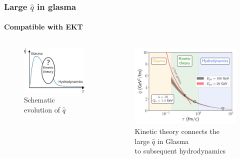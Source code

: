 \documentclass[aspectratio=169,11pt,usenames,dvipsnames]{beamer}
\begin{document}


\begin{frame}
    \frametitle{Large $\hat{q}$ in glasma}
    \framesubtitle{Compatible with EKT}
    \vspace{-0.4cm}
    \begin{columns}[onlytextwidth,t]
        \begin{figure}[!hbt]
            \centering
            \captionsetup{justification=centering}
            \caption{Schematic evolution of $\hat{q}$}\vspace{-0.3cm}
            \includegraphics[width=0.8\columnwidth]{images/qhat_schematic_evolution.pdf}\vspace{-0.3cm}
        \end{figure}
        \begin{figure}[!hbt]
            \centering
            \captionsetup{justification=centering}
            \caption{{\color{ForestGreen}Kinetic theory} connects the large $\hat{q}$ in {\color{Dandelion}Glasma}\\ to subsequent {\color{Periwinkle}hydrodynamics}}\vspace{-0.2cm}
            \includegraphics[width=0.8\columnwidth]{images/2023-03-07-16-41-35_qhat_appetizer_glasma_comparison_493.pdf}
        \end{figure}
    \end{columns}   


\end{frame}
\end{document}
